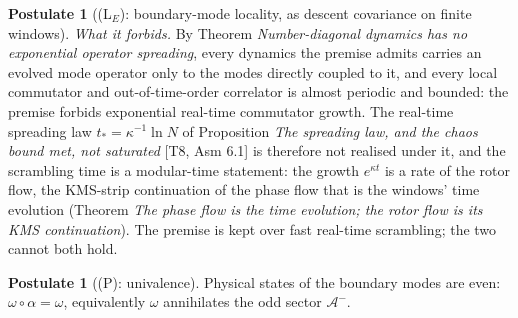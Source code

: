 \documentclass[11pt]{article}
\theoremstyle{definition}
\newtheorem{postulate}[theorem]{Postulate}
\theoremstyle{plain}
\providecommand{\Aod}{}\renewcommand{\Aod}{\mathcal{A}^{-}}
\begin{document}
\begin{postulate}[(L$_E$): boundary-mode locality, as descent covariance on finite windows]
\emph{What it forbids.} By Theorem \emph{Number-diagonal dynamics has no exponential operator spreading}, every dynamics the premise admits carries an evolved mode operator only to the modes directly coupled to it, and every local commutator and out-of-time-order correlator is almost periodic and bounded: the premise forbids exponential real-time commutator growth. The real-time spreading law $t_{*} = \kappa^{-1}\ln N$ of Proposition \emph{The spreading law, and the chaos bound met, not saturated} [T8, Asm 6.1] is therefore not realised under it, and the scrambling time is a modular-time statement: the growth $e^{\kappa t}$ is a rate of the rotor flow, the KMS-strip continuation of the phase flow that is the windows' time evolution (Theorem \emph{The phase flow is the time evolution; the rotor flow is its KMS continuation}). The premise is kept over fast real-time scrambling; the two cannot both hold.
\end{postulate}

\begin{postulate}[(P): univalence]\label{c:singularity.p-univalence}
Physical states of the boundary modes are even: $\omega \circ \alpha = \omega$, equivalently $\omega$ annihilates the odd sector $\Aod$.
\end{postulate}
\end{document}
